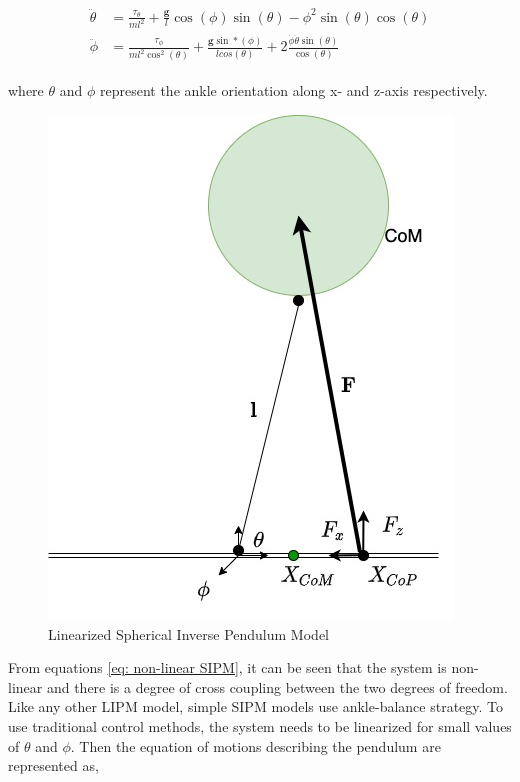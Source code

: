 \begin{align}
    \label{eq: non-linear SIPM}
    \begin{split}
    \ddot{\theta} &= \frac{\tau_\theta}{ml^2} + \frac{\mathbf{g}}{l}\cos(\phi)\sin(\theta) - \phi^2\sin(\theta)\cos(\theta) \\
    \ddot{\phi} &= \frac{\tau_\phi}{ml^2\cos^2(\theta)} + \frac{\mathbf{g}\sin*(\phi)}{lcos(\theta)} + 2\frac{\dot{\phi}\dot{\theta}\sin(\theta)}{\cos(\theta)}
    \end{split}
\end{align}

where $\theta$ and $\phi$ represent the ankle orientation along x- and z-axis respectively.
\begin{figure}[h!]
    \centering
    \includegraphics[scale=0.5]{images/SIPM.jpg}\hfill
    \caption{Linearized Spherical Inverse Pendulum Model}\hfill
    \label{fig: sipm}
\end{figure}

From equations \ref{eq: non-linear SIPM}, it can be seen that the system is non-linear and there is a degree of cross coupling between the two degrees of freedom. Like any other LIPM model, simple SIPM models use ankle-balance strategy. To use traditional control methods, the system needs to be linearized for small values of $\theta$
and $\phi$. Then the equation of motions describing the pendulum are represented as,


